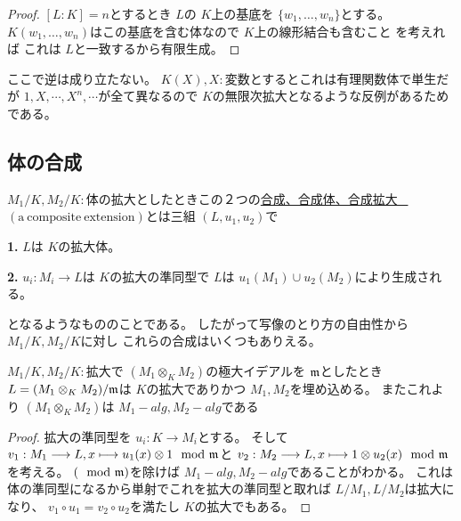 \documentclass[../master_galois_theory]{subfiles}
\begin{document}
\begin{proof}
  $[L:K] = n$とするとき
  $L$の $K$上の基底を $\{ w_1 , \dots , w_n \}$とする。
  $K(w_1 , \dots , w_n)$はこの基底を含む体なので $K$上の線形結合も含むこと
  を考えれば
  これは $L$と一致するから有限生成。
\end{proof}

ここで逆は成り立たない。
$K(X) , X:$変数とするとこれは有理関数体で単生だが
$1 , X , \cdots , X^n , \cdots$が全て異なるので
$K$の無限次拡大となるような反例があるためである。

\subsection{体の合成}

\begin{defi}
  $M_1/K , M_2/K:$体の拡大としたときこの２つの\underline{合成、合成体、合成拡大 \  $(\mathrm{a \  composite \  extension})$}とは三組 $(L,u_1,u_2)$で

  \textbf{1.}
  $L$は $K$の拡大体。

  \textbf{2.}
  $u_i : M_i \longrightarrow L$は $K$の拡大の準同型で
  $L$は $u_1(M_1) \cup u_2(M_2)$により生成される。

  となるようなもののことである。
  したがって写像のとり方の自由性から $M_1/K , M_2/K$に対し
  これらの合成はいくつもありえる。
\end{defi}

\begin{corl} \label{corl:scholium}
  $M_1/K , M_2/K:$拡大で $(M_1 \otimes_K M_2)$の極大イデアルを $\mathfrak{m}$としたとき
  $L = (M_1 \otimes_K M_2)/ \mathfrak{m}$は $K$の拡大でありかつ
  $M_1 , M_2$を埋め込める。
  またこれより $(M_1 \otimes_K M_2)$は $M_1-alg , M_2-alg$である
\end{corl}

\begin{proof}
  拡大の準同型を $u_i : K \longrightarrow M_i$とする。
  そして
  $v_1 : M_1 \longrightarrow L , x \longmapsto u_1(x) \otimes 1 \mod {\mathfrak{m}}$と
  $v_2 : M_2 \longrightarrow L , x \longmapsto 1 \otimes u_2(x) \mod {\mathfrak{m}}$を考える。
  $(\mod {\mathfrak{m}})$を除けば $M_1-alg , M_2-alg$であることがわかる。
  これは体の準同型になるから単射でこれを拡大の準同型と取れば
  $L/M_1 , L/M_2$は拡大になり、
  $v_1 \circ u_1 = v_2 \circ u_2$を満たし $K$の拡大でもある。


\end{proof}

\clearpage
\end{document}
